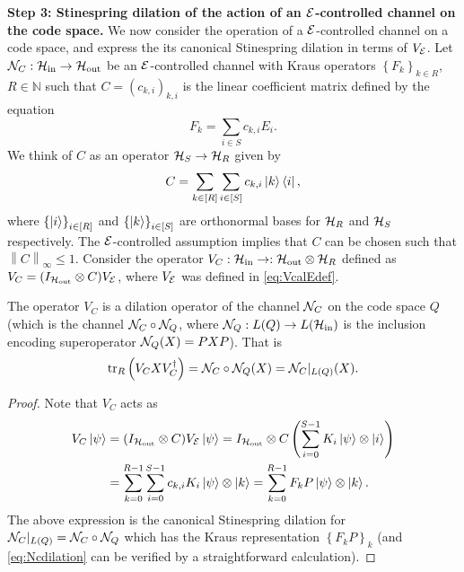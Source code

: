 \documentclass[10pt]{article}
\newcommand{\SIN}{\mathrm{in}}
\newcommand{\SOUT}{\mathrm{out}}
\newcommand{\tr}{\mathrm{tr}}
\newcommand{\N}{\mathbb{N}}
\newcommand{\p}[1]{\left(#1\right)}
\newcommand{\ppp}[1]{\left\{#1\right\}}
\newcommand{\norm}[1]{\left\|#1\right\|}
\newcommand{\s}[1]{\mathsf{#1}}
\begin{document}
\noindent\textbf{Step 3: Stinespring dilation of the action of an ${\cal E}$-controlled channel on the code space.} We now consider the operation of a ${\cal E}$-controlled channel on a code space, and express the its canonical Stinespring dilation in terms of $V_{{\cal E}}$. Let $\calN_C:\calH_{\SIN}\to \calH_{\SOUT}$ be an ${\cal E}$-controlled channel with Kraus operators $\ppp{F_k}_{k\in R}$, $R\in \N$ such that $C=(c_{k,i})_{k,i}$ is the linear coefficient matrix defined by the equation
    \[
    F_k=\sum_{i\in S}c_{k,i}E_i.
    \]
We think of $C$ as an operator ${\cal H}_{S}\to {\cal H}_{R}$ given by
\begin{equation}
    C=\sum_{k\in [R]}\sum_{i\in [S]}c_{k,i}\ket{k}\bra{i}, 
    \label{eq:Coperator}
\end{equation}
where $\ppp{\ket{i}}_{i \in [R]} $ and $\ppp{\ket{k}}_{i \in [S]} $ are orthonormal bases for ${\cal H}_{R}$ and ${\cal H}_{S}$ respectively. The ${\cal E}$-controlled assumption implies that $C$ can be chosen such that $\norm{C}_\infty\leq 1$. Consider the operator $V_{C}:\calH_{\SIN}\to :\calH_{\SOUT}\otimes \calH_R  $ defined as $V_C=(I_{\calH_{\SOUT}}\otimes C )V_{\calE}$, 
where $V_{\cal E}$ was defined in \eqref{eq:VcalEdef}.

\begin{lemma}\label{lem:DilationNoisyStates}
    The operator $V_C$ is a dilation operator of the channel ${\cal N}_C$ on the code space $Q$ (which is the channel ${\cal N}_C\circ {\cal N}_Q$, where $\calN_Q:L(Q)\to L(\calH_{\SIN})$ is the inclusion encoding superoperator ${\cal N}_Q(X)=PXP$). That is
    \begin{equation}
        \tr_{{R}}\p{V_{C}X V_{C}^\dag}=\calN_C\circ\calN_Q(X)\label{eq:Ncdilation}=\calN_C|_{L(Q)}(X).
            \end{equation}
\end{lemma}
\begin{proof}
    Note that $V_C$ acts as
\begin{align}
    V_C\ket{\psi}\nonumber&=(I_{\calH_{\SOUT}}\otimes C) V_{\calE}\ket{\psi}=I_{\calH_{\SOUT}}\otimes C \p{\sum_{i=0}^{S-1}K_i\ket{\psi} \otimes \ket{i}}\\
    &=\sum_{k=0}^{R-1} \sum_{i=0}^{S-1} c_{k,i}K_i\ket{\psi} \otimes \ket{k}=\sum_{k=0}^{R-1} F_k P\ket{\psi} \otimes \ket{k}.\label{eq:ChannelVCcanonical}
\end{align}
The above expression is the canonical Stinespring dilation for ${\cal N}_C|_{L(Q)}={\cal N}_C\circ {\cal N}_Q$ which has the Kraus representation $\ppp{F_kP}_k$ (and \eqref{eq:Ncdilation} can be verified by a straightforward calculation). 
\end{proof}\vspace{0.2cm}
\end{document}
